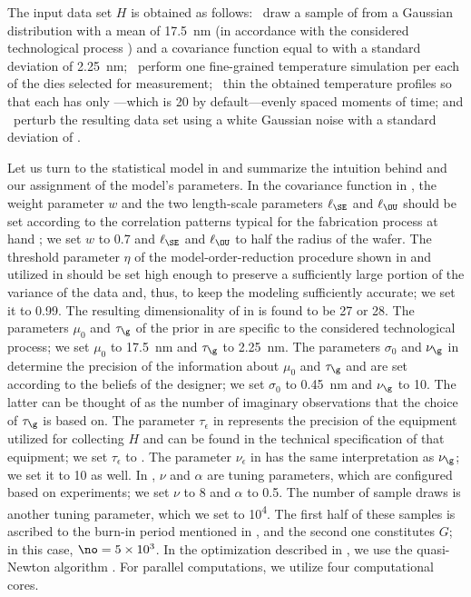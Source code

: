 The input data set $H$ is obtained as follows: \one~draw a sample of \g from a
Gaussian distribution with a mean of 17.5~nm (in accordance with the considered
technological process \cite{ptm}) and a covariance function equal to
 with a standard deviation of 2.25~nm; \two~perform one
fine-grained temperature simulation per each of the \hnd dies selected for
measurement; \three~thin the obtained temperature profiles so that each has only
\ns---which is 20 by default---evenly spaced moments of time; and \four~perturb
the resulting data set using a white Gaussian noise with a standard deviation of
.

Let us turn to the statistical model in  and
summarize the intuition behind and our assignment of the model's parameters. In
the covariance function in , the weight parameter $w$ and
the two length-scale parameters $\ell_\SE$ and $\ell_\OU$ should be set
according to the correlation patterns typical for the fabrication process at
hand \cite{chandrakasan2000, cheng2011}; we set $w$ to 0.7 and $\ell_\SE$ and
$\ell_\OU$ to half the radius of the wafer. The threshold parameter $\eta$ of
the model-order-reduction procedure shown in  and utilized
in  should be set high enough to preserve a sufficiently
large portion of the variance of the data and, thus, to keep the modeling
sufficiently accurate; we set it to 0.99. The resulting dimensionality \nz of
\vz in  is found to be 27 or 28. The parameters $\mu_0$
and $\tau_\g$ of the prior in  are specific to the considered
technological process; we set $\mu_0$ to 17.5~nm and $\tau_\g$ to 2.25~nm. The
parameters $\sigma_0$ and $\nu_\g$ in  determine the precision
of the information about $\mu_0$ and $\tau_\g$ and are set according to the
beliefs of the designer; we set $\sigma_0$ to 0.45~nm and $\nu_\g$ to 10. The
latter can be thought of as the number of imaginary observations that the choice
of $\tau_\g$ is based on. The parameter $\tau_\epsilon$ in 
represents the precision of the equipment utilized for collecting $H$ and can be
found in the technical specification of that equipment; we set $\tau_\epsilon$
to . The parameter $\nu_\epsilon$ in  has the same
interpretation as $\nu_\g$; we set it to 10 as well. In ,
$\nu$ and $\alpha$ are tuning parameters, which are configured based on
experiments; we set $\nu$ to 8 and $\alpha$ to 0.5. The number of sample draws
is another tuning parameter, which we set to 10\textsuperscript{4}. The first
half of these samples is ascribed to the burn-in period mentioned in
, and the second one constitutes $G$; in this case,
$\no = 5 \times 10^3$. In the optimization described in
, we use the quasi-Newton algorithm \cite{press2007}.
For parallel computations, we utilize four computational cores.

